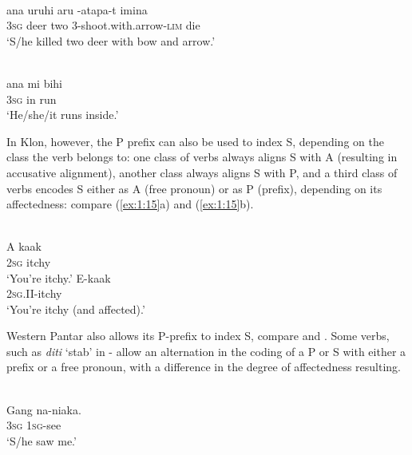\ea%
\label{ex:1:13}
\\
\gll {\textglotstop}ana   uruhi{\ng}  aru {\textglotstop}-atapa-t       imina \\
 3\textsc{sg}  deer   two 3-shoot.with.arrow-\textsc{lim}  die  \\
\glt `S/he killed two deer with bow and arrow.'
\z







\ea%
\label{ex:1:14}
\\
\gll {\textglotstop}ana  mi   bihi  \\
3\textsc{sg}  in  run   \\
\glt `He/she/it runs inside.'
\z







In Klon, however, the P prefix can also be used to index S, depending on the class the verb belongs to: one class of verbs always aligns S with A (resulting in accusative alignment), another class always aligns S with P, and a third class of verbs encodes S either as A (free pronoun) or as P (prefix), depending on its affectedness: compare (\ref{ex:1:15}a) and (\ref{ex:1:15}b).



\ea%
\label{ex:1:15}
 \\
\ea
\gll A  kaak \\
 \textsc{2sg} itchy      \\
\glt `You're itchy.'
\ex
\gll E-kaak \\
  \textsc{2sg.II}{}-itchy   \\
\glt `You're itchy (and affected).' 
\z\z
 


Western Pantar also allows its P-prefix to index S, compare  and .  Some verbs, such as \textit{diti} `stab' in - allow an alternation in the coding of a P or S with either a prefix or a free pronoun, with a difference in the degree of affectedness resulting. 


\ea%
\label{ex:1:16}
 \\
\gll Gang  na-niaka. \\
 3\textsc{sg}  \textsc{1sg}{}-see      \\
\glt `S/he saw me.' 
\z
 

